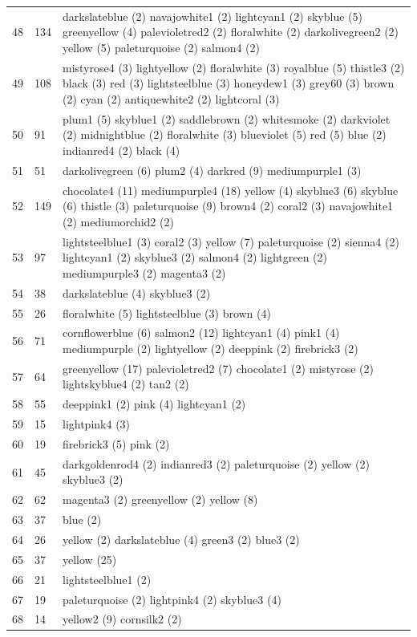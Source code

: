 \begin{landscape}
\begin{longtable}{|p{1.5cm}|p{1.25cm}|p{21cm}|}
48 & 134 & darkslateblue (2) navajowhite1 (2) lightcyan1 (2) skyblue (5) greenyellow (4) palevioletred2 (2) floralwhite (2) darkolivegreen2 (2) yellow (5) paleturquoise (2) salmon4 (2) \\
49 & 108 & mistyrose4 (3) lightyellow (2) floralwhite (3) royalblue (5) thistle3 (2) black (3) red (3) lightsteelblue (3) honeydew1 (3) grey60 (3) brown (2) cyan (2) antiquewhite2 (2) lightcoral (3) \\
50 & 91 & plum1 (5) skyblue1 (2) saddlebrown (2) whitesmoke (2) darkviolet (2) midnightblue (2) floralwhite (3) blueviolet (5) red (5) blue (2) indianred4 (2) black (4) \\
51 & 51 & darkolivegreen (6) plum2 (4) darkred (9) mediumpurple1 (3) \\
52 & 149 & chocolate4 (11) mediumpurple4 (18) yellow (4) skyblue3 (6) skyblue (6) thistle (3) paleturquoise (9) brown4 (2) coral2 (3) navajowhite1 (2) mediumorchid2 (2) \\
53 & 97 & lightsteelblue1 (3) coral2 (3) yellow (7) paleturquoise (2) sienna4 (2) lightcyan1 (2) skyblue3 (2) salmon4 (2) lightgreen (2) mediumpurple3 (2) magenta3 (2) \\
54 & 38 & darkslateblue (4) skyblue3 (2) \\
55 & 26 & floralwhite (5) lightsteelblue (3) brown (4) \\
56 & 71 & cornflowerblue (6) salmon2 (12) lightcyan1 (4) pink1 (4) mediumpurple (2) lightyellow (2) deeppink (2) firebrick3 (2) \\
57 & 64 & greenyellow (17) palevioletred2 (7) chocolate1 (2) mistyrose (2) lightskyblue4 (2) tan2 (2) \\
58 & 55 & deeppink1 (2) pink (4) lightcyan1 (2) \\
59 & 15 & lightpink4 (3) \\
60 & 19 & firebrick3 (5) pink (2) \\
61 & 45 & darkgoldenrod4 (2) indianred3 (2) paleturquoise (2) yellow (2) skyblue3 (2) \\
62 & 62 & magenta3 (2) greenyellow (2) yellow (8) \\
63 & 37 & blue (2) \\
64 & 26 & yellow (2) darkslateblue (4) green3 (2) blue3 (2) \\
65 & 37 & yellow (25) \\
66 & 21 & lightsteelblue1 (2) \\
67 & 19 & paleturquoise (2) lightpink4 (2) skyblue3 (4) \\
68 & 14 & yellow2 (9) cornsilk2 (2) \\

\end{longtable}
\end{landscape}
